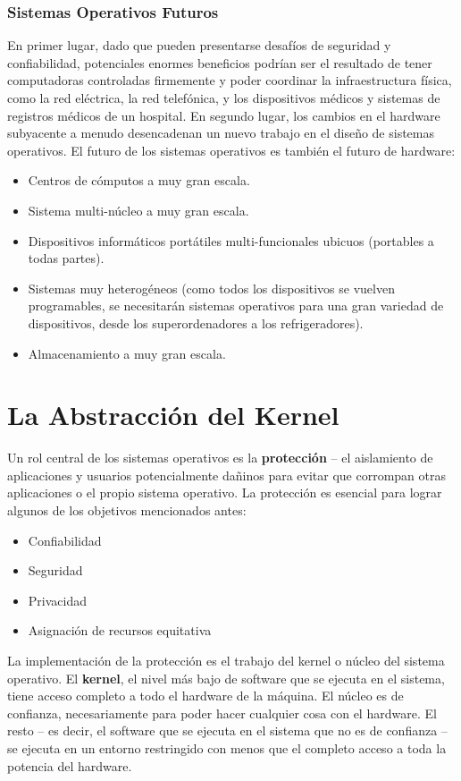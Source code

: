 \documentclass[10pt]{book}
\begin{document}
\subsection{Sistemas Operativos Futuros}
En primer lugar, dado que pueden presentarse desafíos de seguridad y confiabilidad, potenciales enormes beneficios podrían ser el resultado de tener computadoras controladas firmemente y poder coordinar la infraestructura física, como la red eléctrica, la red telefónica, y los dispositivos médicos y sistemas de registros médicos de un hospital. En segundo lugar, los cambios en el hardware subyacente a menudo desencadenan un nuevo trabajo en el diseño de sistemas operativos. El futuro de los sistemas operativos es también el futuro de hardware:

\begin{itemize}
\item Centros de cómputos a muy gran escala.
\item Sistema multi-núcleo a muy gran escala.
\item Dispositivos informáticos portátiles multi-funcionales ubicuos (portables a todas partes).
\item Sistemas muy heterogéneos (como todos los dispositivos se vuelven programables, se necesitarán sistemas operativos para una gran variedad de dispositivos, desde los superordenadores a los refrigeradores).
\item Almacenamiento a muy gran escala.
\end{itemize}



\chapter{La Abstracción del Kernel}
Un rol central de los sistemas operativos es la \textbf{protección} -- el aislamiento de aplicaciones y usuarios potencialmente dañinos para evitar que corrompan otras aplicaciones o el propio sistema operativo. La protección es esencial para lograr algunos de los objetivos mencionados antes:
\begin{itemize}
\item Confiabilidad
\item Seguridad
\item Privacidad
\item Asignación de recursos equitativa
\end{itemize}

La implementación de la protección es el trabajo del kernel o núcleo del sistema operativo. El \textbf{kernel}, el nivel más bajo de software que se ejecuta en el sistema, tiene acceso completo a todo el hardware de la máquina. El núcleo es de confianza, necesariamente para poder hacer cualquier cosa con el hardware. El resto -- es decir, el software que se ejecuta en el sistema que no es de confianza -- se ejecuta en un entorno restringido con menos que el completo acceso a toda la potencia del hardware.
\end{document}
